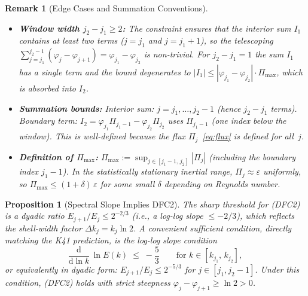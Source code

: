 \documentclass[12pt,a4paper]{article}
\theoremstyle{breakdef}
\theoremstyle{breakplain}
\newtheorem{proposition}[definition]{Proposition}
\theoremstyle{breakdef}
\newtheorem{remark}[definition]{Remark}
\begin{document}
\begin{remark}[Edge Cases and Summation Conventions]
\label{rem:edge-cases}
\mbox{}
\begin{itemize}
  \item \textbf{Window width $j_2 - j_1 \ge 2$:}\quad
    The constraint ensures that the interior sum $I_1$ contains at least
    two terms ($j = j_1$ and $j = j_1+1$), so the telescoping
    $\sum_{j=j_1}^{j_2-1}(\varphi_j - \varphi_{j+1}) =
    \varphi_{j_1} - \varphi_{j_2}$ is non-trivial. For $j_2 - j_1 = 1$
    the sum $I_1$ has a single term and the bound degenerates to
    $|I_1| \le |\varphi_{j_1}-\varphi_{j_2}|\cdot\Pi_{\max}$, which is
    absorbed into $I_2$.
  \item \textbf{Summation bounds:}\quad
    Interior sum: $j = j_1, \ldots, j_2-1$ (hence $j_2-j_1$ terms).
    Boundary term: $I_2 = \varphi_{j_1}\Pi_{j_1-1} -
    \varphi_{j_2}\Pi_{j_2}$ uses $\Pi_{j_1-1}$ (one index below the
    window). This is well-defined because the flux
    $\Pi_j$~\eqref{eq:flux} is defined for all~$j$.
  \item \textbf{Definition of $\Pi_{\max}$:}\;
    $\Pi_{\max} := \sup_{j \in [j_1-1,\, j_2]} |\Pi_j|$ (including the
    boundary index $j_1-1$). In the statistically stationary inertial
    range, $\Pi_j \approx \varepsilon$ uniformly, so $\Pi_{\max} \le
    (1+\delta)\,\varepsilon$ for some small $\delta$ depending on
    Reynolds number.
\end{itemize}
\end{remark}

\begin{proposition}[Spectral Slope Implies DFC2]\label{prop:slope-DFC2}
The sharp threshold for \textup{(DFC2)} is a dyadic ratio
$E_{j+1}/E_j \le 2^{-2/3}$ (i.e., a log-log slope $\le -2/3$), which
reflects the shell-width factor $\Delta k_j = k_j \ln 2$.  A convenient
\emph{sufficient} condition, directly matching the K41 prediction, is the
\emph{log-log slope condition}
\begin{equation}\label{eq:slope-condition}
  \frac{\mathrm{d}}{\mathrm{d}\ln k}\,\ln E(k)
  \;\le\; -\frac{5}{3}
  \qquad \text{for } k \in [k_{j_1},\, k_{j_2}],
\end{equation}
or equivalently in dyadic form: $E_{j+1}/E_j \le 2^{-5/3}$ for
$j \in [j_1, j_2-1]$.  Under this condition, \textup{(DFC2)} holds
with strict steepness $\varphi_j - \varphi_{j+1} \ge \ln 2 > 0$.
\end{proposition}
\end{document}
